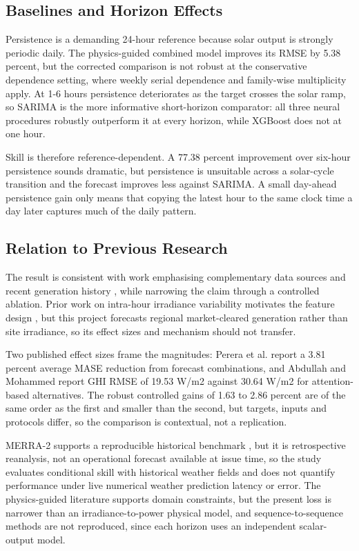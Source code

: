 \subsection{Baselines and Horizon Effects}

Persistence is a demanding 24-hour reference because solar output is strongly periodic daily. The physics-guided combined model improves its RMSE by 5.38 percent, but the corrected comparison is not robust at the conservative dependence setting, where weekly serial dependence and family-wise multiplicity apply. At 1-6 hours persistence deteriorates as the target crosses the solar ramp, so SARIMA is the more informative short-horizon comparator: all three neural procedures robustly outperform it at every horizon, while XGBoost does not at one hour.

Skill is therefore reference-dependent. A 77.38 percent improvement over six-hour persistence sounds dramatic, but persistence is unsuitable across a solar-cycle transition and the forecast improves less against SARIMA. A small day-ahead persistence gain only means that copying the latest hour to the same clock time a day later captures much of the daily pattern.

\subsection{Relation to Previous Research}

The result is consistent with work emphasising complementary data sources and recent generation history \cite{rabault2025datafusion}, while narrowing the claim through a controlled ablation. Prior work on intra-hour irradiance variability motivates the feature design \cite{huang2016intra}, but this project forecasts regional market-cleared generation rather than site irradiance, so its effect sizes and mechanism should not transfer.

Two published effect sizes frame the magnitudes: Perera et al. \cite{perera2022multires} report a 3.81 percent average MASE reduction from forecast combinations, and Abdullah and Mohammed \cite{abdullah2026physics} report GHI RMSE of 19.53 W/m2 against 30.64 W/m2 for attention-based alternatives. The robust controlled gains of 1.63 to 2.86 percent are of the same order as the first and smaller than the second, but targets, inputs and protocols differ, so the comparison is contextual, not a replication.

MERRA-2 supports a reproducible historical benchmark \cite{pfenninger2016longterm}, but it is retrospective reanalysis, not an operational forecast available at issue time, so the study evaluates conditional skill with historical weather fields and does not quantify performance under live numerical weather prediction latency or error. The physics-guided literature \cite{abdullah2026physics} supports domain constraints, but the present loss is narrower than an irradiance-to-power physical model, and sequence-to-sequence methods \cite{mukhoty2019seq2seq} are not reproduced, since each horizon uses an independent scalar-output model.

